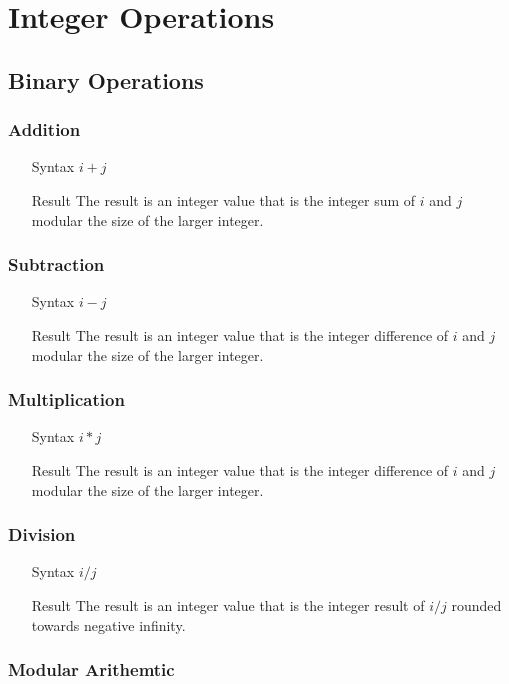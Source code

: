 \section{Integer Operations}
\subsection{Binary Operations}
\subsubsection{Addition}
\begin{itemize}
\item[Syntax] $i + j$
\item[Result] The result is an integer value that is the integer sum of $i$ and $j$ modular the size of the larger integer.
\end{itemize}
\subsubsection{Subtraction}
\begin{itemize}
\item[Syntax] $i - j$
\item[Result] The result is an integer value that is the integer difference of $i$ and $j$ modular the size of the larger integer.
\end{itemize}
\subsubsection{Multiplication}
\begin{itemize}
\item[Syntax] $i * j$
\item[Result] The result is an integer value that is the integer difference of $i$ and $j$ modular the size of the larger integer.
\end{itemize}
\subsubsection{Division}
\begin{itemize}
\item[Syntax] $i / j$
\item[Result] The result is an integer value that is the integer result of $i / j$ rounded towards negative infinity.
\end{itemize}
\subsubsection{Modular Arithemtic}
